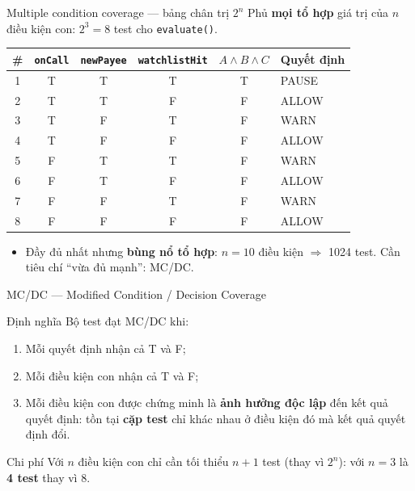 \documentclass[aspectratio=169,12pt]{beamer}
\begin{document}
\begin{frame}{Multiple condition coverage --- bảng chân trị $2^n$}
  Phủ \textbf{mọi tổ hợp} giá trị của $n$ điều kiện con: $2^3 = 8$ test
  cho \texttt{evaluate()}.

  \begin{center}
  \small
  \begin{tabular}{cccccl}
    \toprule
    \# & \texttt{onCall} & \texttt{newPayee} & \texttt{watchlistHit}
       & $A \land B \land C$ & \textbf{Quyết định} \\
    \midrule
    1 & T & T & T & T & PAUSE \\
    2 & T & T & F & F & ALLOW \\
    3 & T & F & T & F & WARN \\
    4 & T & F & F & F & ALLOW \\
    5 & F & T & T & F & WARN \\
    6 & F & T & F & F & ALLOW \\
    7 & F & F & T & F & WARN \\
    8 & F & F & F & F & ALLOW \\
    \bottomrule
  \end{tabular}
  \end{center}

  \begin{itemize}
    \item Đầy đủ nhất nhưng \textbf{bùng nổ tổ hợp}: $n = 10$ điều kiện
          $\Rightarrow$ 1024 test. Cần tiêu chí ``vừa đủ mạnh'': MC/DC.
  \end{itemize}
\end{frame}

\begin{frame}{MC/DC --- Modified Condition / Decision Coverage}
  \begin{block}{Định nghĩa \cite{ammann,istqb}}
    Bộ test đạt MC/DC khi:
    \begin{enumerate}
      \item Mỗi quyết định nhận cả T và F;
      \item Mỗi điều kiện con nhận cả T và F;
      \item Mỗi điều kiện con được chứng minh là \textbf{ảnh hưởng
            độc lập} đến kết quả quyết định: tồn tại \textbf{cặp test}
            chỉ khác nhau ở điều kiện đó mà kết quả quyết định đổi.
    \end{enumerate}
  \end{block}

  \vspace{0.3em}
  \begin{exampleblock}{Chi phí}
    Với $n$ điều kiện con chỉ cần tối thiểu $n + 1$ test
    (thay vì $2^n$): với $n=3$ là \textbf{4 test} thay vì 8.
  \end{exampleblock}
\end{frame}
\end{document}
